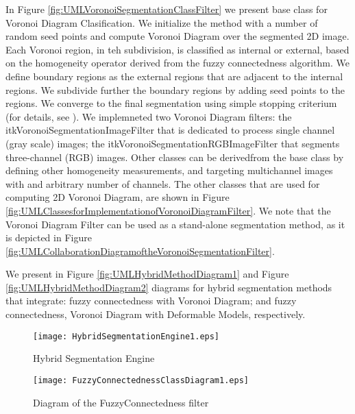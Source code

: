 In Figure \ref{fig:UMLVoronoiSegmentationClassFilter} we present base class for
Voronoi Diagram Clasification. We initialize the method with a number of random
seed points and compute Voronoi Diagram over the segmented 2D image. Each
Voronoi region, in teh subdivision, is classified as internal or external,
based on the homogeneity operator derived from the fuzzy connectedness
algorithm.  We define boundary regions as the external regions that are
adjacent to the internal regions.  We subdivide further the boundary regions
by adding seed points to the regions. We converge to the final segmentation
using simple stopping criterium (for details, see \cite{Imielinska2001}). We
implemneted two Voronoi Diagram filters: the
itkVoronoiSegmentationImageFilter that is dedicated to process single channel
(gray scale) images; the itkVoronoiSegmentationRGBImageFilter that segments
three-channel (RGB) images. Other classes can be derivedfrom the base class
by defining other homogeneity measurements, and targeting multichannel images
with and arbitrary number of channels.  The other classes that are used for
computing 2D Voronoi Diagram, are shown in Figure
\ref{fig:UMLClassesforImplementationofVoronoiDiagramFilter}. We note that the
Voronoi Diagram Filter can be used as a stand-alone segmentation method, as
it is depicted in Figure
\ref{fig:UMLCollaborationDiagramoftheVoronoiSegmentationFilter}.

 We present in Figure \ref{fig:UMLHybridMethodDiagram1} and Figure
 \ref{fig:UMLHybridMethodDiagram2} diagrams for hybrid segmentation methods
 that integrate: fuzzy connectedness with Voronoi Diagram; and fuzzy
 connectedness, Voronoi Diagram with Deformable Models, respectively.


%
%
%

\begin{figure}
\center
\texttt{[image: HybridSegmentationEngine1.eps]}
\caption{Hybrid Segmentation Engine}
\label{fig:ComponentsofaHybridSegmentationApproach}
\end{figure}


\begin{figure}
\center
\texttt{[image: FuzzyConnectednessClassDiagram1.eps]}
\caption{Diagram of the FuzzyConnectedness filter}
\label{fig:UMLClassDiagramoftherFuzzyConnectednessFilter}
\end{figure}


